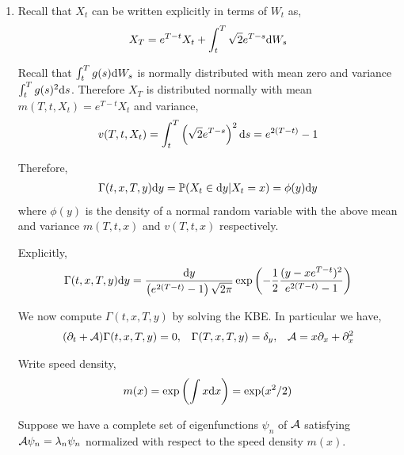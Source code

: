 \begin{solution}[Solution]
\begin{enumerate}[label=(\alph*)]
    \item Recall that \( X_t \) can be written explicitly in terms of \( W_t \) as,
        \begin{align*}
            X_T = e^{T-t} X_t + \int_t^T \sqrt{2}e^{T-s} \d W_s %
        \end{align*}

        
        Recall that \( \int_t^T g(s)\mathrm{d} W_s \) is normally distributed with mean zero and variance \( \int_t^T g(s)^2 \mathrm{d} s \).
        Therefore \( X_T \) is distributed normally with mean \( m(T,t,X_t) = e^{T-t}X_t \) and variance,
        \begin{align*}
            v(T,t,X_t) = \int_t^T \left( \sqrt{2} e^{T-s} \right)^2\mathrm{d} s = e^{2(T-t)}-1
        \end{align*}
        

        Therefore,
        \begin{align*}
            \Gamma(t,x,T,y)\mathrm{d} y = \mathbb{P}(X_t\in\mathrm{d} y | X_t = x) = \phi(y)\mathrm{d} y
        \end{align*}
        where \( \phi(y) \) is the density of a normal random variable with the above mean and variance \( m(T,t,x) \) and \( v(T,t,x) \) respectively.
        
        Explicitly,
        \begin{align*}
            \Gamma(t,x,T,y)\mathrm{d} y = \frac{\mathrm{d} y}{ \left( e^{2(T-t)}-1 \right)\sqrt{2\pi}} \exp \left( - \frac{1}{2} \frac{ (y-xe^{T-t})^2}{ e^{2(T-t)}-1}  \right)
        \end{align*}
        
        \hrulefill

        We now compute \( \Gamma(t,x,T,y) \) by solving the KBE. In particular we have,
        \begin{align*}
            (\partial_t + \mathcal{A}) \Gamma(t,x,T,y) = 0, && \Gamma(T,x,T,y) = \delta_y, && \mathcal{A} = x\partial_x + \partial_x^2
        \end{align*}

        Write speed density,
        \begin{align*}
            m(x) = \exp \left( \int x \mathrm{d} x \right) = \exp(x^2/2)
        \end{align*}
        

        Suppose we have a complete set of eigenfunctions \( \psi_n \) of \( \mathcal{A} \) satisfying \( \mathcal{A} \psi_n = \lambda_n\psi_n \) normalized with respect to the speed density \( m(x) \).


\end{enumerate}
\end{solution}
